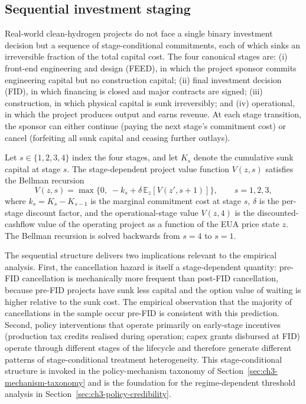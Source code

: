 \subsection{Sequential investment staging}
\label{sec:ch3-sequential-staging}

Real-world clean-hydrogen projects do not face a single binary investment decision but a sequence of stage-conditional commitments, each of which sinks an irreversible fraction of the total capital cost. The four canonical stages are: (i) front-end engineering and design (FEED), in which the project sponsor commits engineering capital but no construction capital; (ii) final investment decision (FID), in which financing is closed and major contracts are signed; (iii) construction, in which physical capital is sunk irreversibly; and (iv) operational, in which the project produces output and earns revenue. At each stage transition, the sponsor can either continue (paying the next stage's commitment cost) or cancel (forfeiting all sunk capital and ceasing further outlays).

Let $s \in \{1, 2, 3, 4\}$ index the four stages, and let $K_s$ denote the cumulative sunk capital at stage $s$. The stage-dependent project value function $V(z, s)$ satisfies the Bellman recursion
\begin{equation}
V(z, s) = \max\Big\{0,\; -k_s + \delta\, \mathbb{E}_z[V(z', s+1)]\Big\}, \qquad s = 1, 2, 3,
\label{eq:bellman-stage}
\end{equation}
where $k_s = K_s - K_{s-1}$ is the marginal commitment cost at stage $s$, $\delta$ is the per-stage discount factor, and the operational-stage value $V(z, 4)$ is the discounted-cashflow value of the operating project as a function of the EUA price state $z$. The Bellman recursion is solved backwards from $s = 4$ to $s = 1$.

The sequential structure delivers two implications relevant to the empirical analysis. First, the cancellation hazard is itself a stage-dependent quantity: pre-FID cancellation is mechanically more frequent than post-FID cancellation, because pre-FID projects have sunk less capital and the option value of waiting is higher relative to the sunk cost. The empirical observation that the majority of cancellations in the sample occur pre-FID is consistent with this prediction. Second, policy interventions that operate primarily on early-stage incentives (production tax credits realised during operation; capex grants disbursed at FID) operate through different stages of the lifecycle and therefore generate different patterns of stage-conditional treatment heterogeneity. This stage-conditional structure is invoked in the policy-mechanism taxonomy of Section~\ref{sec:ch3-mechanism-taxonomy} and is the foundation for the regime-dependent threshold analysis in Section~\ref{sec:ch3-policy-credibility}.

